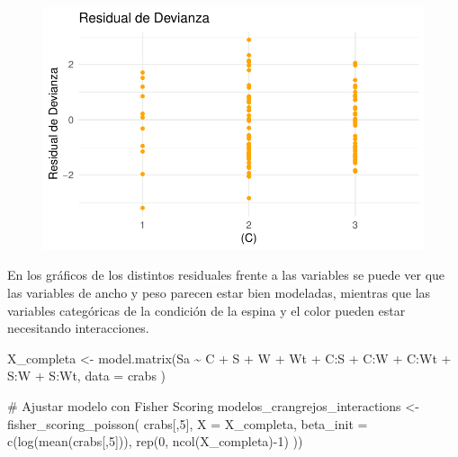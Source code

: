 \documentclass[
  letterpaper,
  DIV=11,
  numbers=noendperiod]{scrartcl}
\newenvironment{Shaded}{\begin{snugshade}}{\end{snugshade}}
\newcommand{\AttributeTok}[1]{\textcolor[rgb]{0.40,0.45,0.13}{#1}}
\newcommand{\CommentTok}[1]{\textcolor[rgb]{0.37,0.37,0.37}{#1}}
\newcommand{\DecValTok}[1]{\textcolor[rgb]{0.68,0.00,0.00}{#1}}
\newcommand{\FunctionTok}[1]{\textcolor[rgb]{0.28,0.35,0.67}{#1}}
\newcommand{\NormalTok}[1]{\textcolor[rgb]{0.00,0.23,0.31}{#1}}
\newcommand{\OtherTok}[1]{\textcolor[rgb]{0.00,0.23,0.31}{#1}}
\newcommand{\SpecialCharTok}[1]{\textcolor[rgb]{0.37,0.37,0.37}{#1}}
\begin{document}
\begin{figure}
%
\begin{minipage}{0.50\linewidth}
\includegraphics{Modelos_files/figure-pdf/unnamed-chunk-32-4.pdf}\end{minipage}%

\end{figure}%

En los gráficos de los distintos residuales frente a las variables se
puede ver que las variables de ancho y peso parecen estar bien
modeladas, mientras que las variables categóricas de la condición de la
espina y el color pueden estar necesitando interacciones.

\begin{Shaded}
\begin{Highlighting}[]
\NormalTok{X\_completa }\OtherTok{\textless{}{-}} \FunctionTok{model.matrix}\NormalTok{(Sa}
  \SpecialCharTok{\textasciitilde{}}\NormalTok{ C }\SpecialCharTok{+}\NormalTok{ S }\SpecialCharTok{+}\NormalTok{ W }\SpecialCharTok{+}\NormalTok{ Wt }\SpecialCharTok{+}
\NormalTok{    C}\SpecialCharTok{:}\NormalTok{S }\SpecialCharTok{+}\NormalTok{ C}\SpecialCharTok{:}\NormalTok{W }\SpecialCharTok{+}\NormalTok{ C}\SpecialCharTok{:}\NormalTok{Wt }\SpecialCharTok{+}
\NormalTok{    S}\SpecialCharTok{:}\NormalTok{W }\SpecialCharTok{+}\NormalTok{ S}\SpecialCharTok{:}\NormalTok{Wt,}
  \AttributeTok{data =}\NormalTok{ crabs}
\NormalTok{)}

\CommentTok{\# Ajustar modelo con Fisher Scoring}
\NormalTok{modelos\_crangrejos\_interactions }\OtherTok{\textless{}{-}} \FunctionTok{fisher\_scoring\_poisson}\NormalTok{(}
\NormalTok{  crabs[,}\DecValTok{5}\NormalTok{],}
  \AttributeTok{X =}\NormalTok{ X\_completa,}
  \AttributeTok{beta\_init =} \FunctionTok{c}\NormalTok{(}\FunctionTok{log}\NormalTok{(}\FunctionTok{mean}\NormalTok{(crabs[,}\DecValTok{5}\NormalTok{])), }\FunctionTok{rep}\NormalTok{(}\DecValTok{0}\NormalTok{, }\FunctionTok{ncol}\NormalTok{(X\_completa)}\SpecialCharTok{{-}}\DecValTok{1}\NormalTok{)}
\NormalTok{))}
\end{Highlighting}
\end{Shaded}
\end{document}
